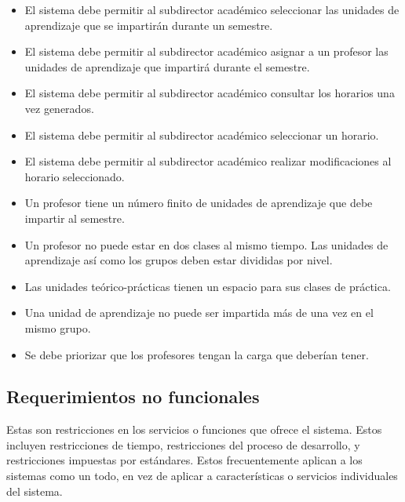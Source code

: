 \begin{itemize}
	\item El sistema debe permitir al subdirector académico seleccionar las unidades de aprendizaje que se impartirán durante un semestre.
	
	\item El sistema debe permitir al subdirector académico asignar a un profesor las unidades de aprendizaje que impartirá durante el semestre.
	
	\item El sistema debe permitir al subdirector académico consultar los horarios una vez generados.
	
	\item El sistema debe permitir al subdirector académico seleccionar un horario.
	
	\item El sistema debe permitir al subdirector académico realizar modificaciones al horario seleccionado.
	
	\item Un profesor tiene un número finito de unidades de aprendizaje que debe impartir al semestre.
	
	\item Un profesor no puede estar en dos clases al mismo tiempo.
	Las unidades de aprendizaje así como los grupos deben estar divididas por nivel.
	
	\item Las unidades teórico-prácticas tienen un espacio para sus clases de práctica.
	
	\item Una unidad de aprendizaje no puede ser impartida más de una vez en el mismo grupo.
	
	\item Se debe priorizar que los profesores tengan la carga que deberían tener.
	
\end{itemize}


\subsection{Requerimientos no funcionales}

Estas son restricciones en los servicios o funciones que ofrece el sistema. Estos incluyen restricciones de tiempo, restricciones del proceso de desarrollo, y restricciones impuestas por estándares. Estos frecuentemente aplican a los sistemas como un todo, en vez de aplicar a características o servicios individuales del sistema. \\


